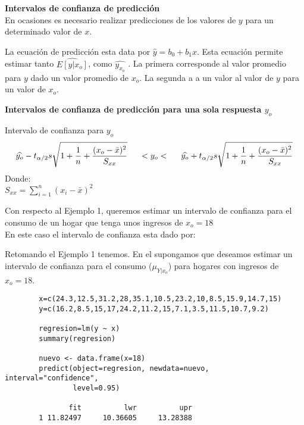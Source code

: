 \documentclass[base=hide,12pt]{elegantbook}
\begin{document}
\vspace{1cm} 
\textcolor{col4}{\Large \bf Intervalos de confianza de predicción} \\

En ocasiones es necesario realizar predicciones de los valores de $y$ para un determinado valor de $x$. 

La ecuación de predicción esta data por $\widehat{y}= b_{0}+ b_{1} x$. Esta ecuación permite estimar tanto $\widehat{E[y|x_{o}]}$, como $\widehat{y_{x_{o}}}$ . La primera corresponde al valor promedio para $y$ dado un valor promedio de $x_{o}$. La segunda a a un valor al valor de $y$ para un valor de $x_{o}$.

\vspace{1cm}
\textcolor{col4}{ \bf Intervalos de confianza de predicción para una sola respuesta $y_{o}$} \\
\begin{Box2}{Intervalo de confianza para $y_{o}$}
	$$
	\widehat{y_{o}} - t_{\alpha/2} s \sqrt{1+\dfrac{1}{n}+ \dfrac{(x_{o}-\bar{x})^{2}}{S_{xx}}}
	\hspace{.5cm}< y_{o} <\hspace{.5cm}
	\widehat{y_{o}} + t_{\alpha/2} s \sqrt{1+\dfrac{1}{n}+ \dfrac{(x_{o}-\bar{x})^{2}}{S_{xx}}}
	$$
	Donde: \\
	$S_{xx}=\displaystyle\sum_{i=1}^{n} (x_{i}-\bar{x})^{2}$	
	
\end{Box2}

Con respecto al Ejemplo 1, queremos estimar un intervalo de confianza para el consumo de un hogar que tenga unos ingresos de $x_{o}=18$ \\

En este caso el intervalo de confianza esta dado por: 



Retomando el Ejemplo 1 tenemos. En el supongamos que deseamos estimar un intervalo de confianza para el consumo ($\mu_{Y|x_{o}}$) para hogares con ingresos de $x_{o} = 18$.\\

\begin{Box3}{}
	\begin{verbatim} 	
		x=c(24.3,12.5,31.2,28,35.1,10.5,23.2,10,8.5,15.9,14.7,15)
		y=c(16.2,8.5,15,17,24.2,11.2,15,7.1,3.5,11.5,10.7,9.2)
		
		regresion=lm(y ~ x)
		summary(regresion)
		
		nuevo <- data.frame(x=18)
		predict(object=regresion, newdata=nuevo, interval="confidence", 
		        level=0.95)
		
		       fit          lwr          upr
		1 11.82497     10.36605     13.28388
		
		
	\end{verbatim}
\end{Box3}
\end{document}
